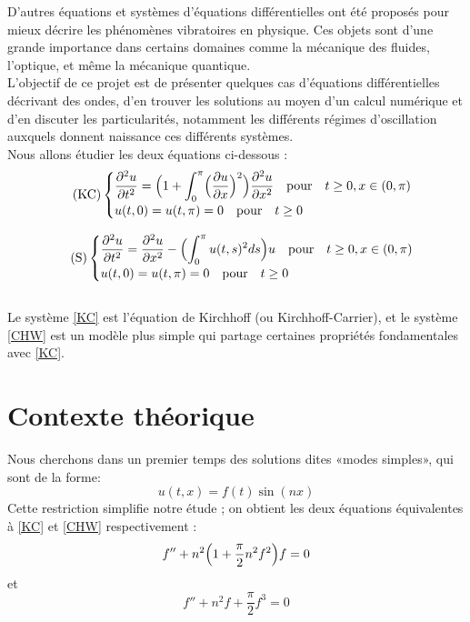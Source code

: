 \documentclass[11pt,a4paper]{article}
\begin{document}
D'autres équations et systèmes d'équations différentielles ont été proposés pour mieux décrire les phénomènes vibratoires en physique. Ces objets sont d'une grande importance dans certains domaines  comme la mécanique des fluides, l'optique, et même la mécanique quantique.\\

L'objectif de ce projet est de présenter quelques cas d'équations différentielles décrivant des ondes, d'en trouver les solutions au moyen d'un calcul numérique et d'en discuter les particularités, notamment les différents régimes d'oscillation auxquels donnent naissance ces différents systèmes.\\
Nous allons étudier les deux équations ci-dessous :
    \begin{equation} \label{KC} \tag{KC}
    \begin{cases} 
    \displaystyle \frac {\partial ^2 u } {\partial t ^2} =  \Bigl( 1+ \int _0^\pi  \Bigl( \frac {\partial u} {\partial x} \Bigr)^2 \Bigr) \frac {\partial ^2 u } {\partial x ^2} \quad  \text{pour}\quad t\ge 0, x\in (0,\pi ) \\ u(t, 0)= u (t, \pi )= 0\quad  \text{pour} \quad t\ge 0
    \end{cases} 
    \end{equation} 



    \begin{equation} \label{CHW} \tag{S}
    \begin{cases} 
    \displaystyle \frac {\partial ^2 u } {\partial t ^2} = \frac {\partial ^2 u } {\partial x ^2} -  \Bigl( \int _0^\pi u(t,s)^2 ds \Bigr) u \quad  \text{pour}\quad t\ge 0, x\in (0,\pi ) \\ u(t, 0)= u (t, \pi )= 0\quad  \text{pour} \quad t\ge 0
    \end{cases} 
    \end{equation} 
    \\
Le système \eqref{KC} est l'équation de Kirchhoff (ou Kirchhoff-Carrier), et le système \eqref{CHW} est un modèle plus simple qui partage certaines propriétés fondamentales avec \eqref{KC}.\\

\section{Contexte théorique}

Nous cherchons dans un premier temps des solutions dites «modes simples», qui sont de la forme:
\begin{equation} \label{UC2} 
u(t, x) = f(t) \sin ( n x )
\end{equation}  
Cette restriction simplifie notre étude ; on obtient les deux équations équivalentes à \eqref{KC} et \eqref{CHW} respectivement : 
\begin{equation} \label{UC1} 
f '' + n^2  \Bigl( 1+  \frac {\pi } {2} n^2  f^2 \Bigr) f=0
\end{equation} 
 et
\begin{equation} \label{UC3} 
f '' + n^2  f +   \frac {\pi } {2}   f^3 =0
\end{equation} \\
\end{document}
